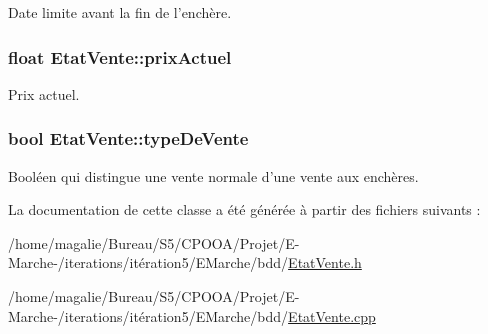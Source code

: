 Date limite avant la fin de l'enchère. 

\hypertarget{class_etat_vente_a69258e9f4890fc1fe84e5afdba35bc0f}{
\subsubsection[{prix\-Actuel}]{\setlength{\rightskip}{0pt plus 5cm}float Etat\-Vente\-::prix\-Actuel\hspace{0.3cm}{\ttfamily [protected]}}}\label{class_etat_vente_a69258e9f4890fc1fe84e5afdba35bc0f}


Prix actuel. 

\hypertarget{class_etat_vente_a6fac909bb6c53a68450ff1f1e287e298}{
\subsubsection[{type\-De\-Vente}]{\setlength{\rightskip}{0pt plus 5cm}bool Etat\-Vente\-::type\-De\-Vente\hspace{0.3cm}{\ttfamily [protected]}}}\label{class_etat_vente_a6fac909bb6c53a68450ff1f1e287e298}


Booléen qui distingue une vente normale d'une vente aux enchères. 



La documentation de cette classe a été générée à partir des fichiers suivants \-:\begin{DoxyCompactItemize}
\item 
/home/magalie/\-Bureau/\-S5/\-C\-P\-O\-O\-A/\-Projet/\-E-\/\-Marche-\//iterations/itération5/\-E\-Marche/bdd/\hyperlink{_etat_vente_8h}{Etat\-Vente.\-h}\item 
/home/magalie/\-Bureau/\-S5/\-C\-P\-O\-O\-A/\-Projet/\-E-\/\-Marche-\//iterations/itération5/\-E\-Marche/bdd/\hyperlink{_etat_vente_8cpp}{Etat\-Vente.\-cpp}\end{DoxyCompactItemize}
